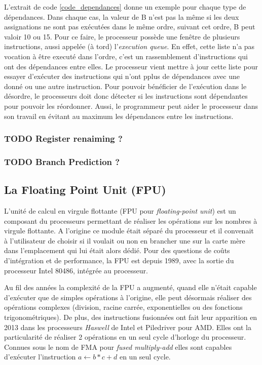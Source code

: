 L'extrait de code \ref{code_dependances} donne un exemple pour chaque type de dépendances. Dans chaque cas, la valeur de B n'est pas la même si les deux assignations ne sont pas exécutées dans le même ordre, suivant cet ordre, B peut valoir 10 ou 15. Pour ce faire, le processeur possède une fenêtre de plusieurs instructions, aussi appelée (à tord) l'\textit{execution queue}. En effet, cette liste n'a pas vocation à être executé dans l'ordre, c'est un rassemblement d'instructions qui ont des dépendances entre elles. Le processeur vient mettre à jour cette liste pour essayer d'exécuter des instructions qui n'ont pplus de dépendances avec une donné ou une autre instruction.
Pour pouvoir bénéficier de l'exécution dans le désordre, le processeurs doit donc détecter si les instructions sont dépendantes pour pouvoir les réordonner. Aussi, le programmeur peut aider le processeur dans son travail en évitant au maximum les dépendances entre les instructions.

\subsubsection{TODO Register renaiming ?}


\subsubsection{TODO Branch Prediction ?}



\subsection{La Floating Point Unit (FPU)}

L'unité de calcul en virgule flottante (FPU pour \textit{floating-point  unit}) est un composant du processeurs permettant de réaliser les opérations sur les nombres à virgule flottante. A l'origine ce module était séparé du processeur et il convenait à l'utilisateur de choisir si il voulait ou non en brancher une sur la carte mère dans l'emplacement qui lui était alors dédié. Pour des questions de coûts d'intégration et de performance, la FPU est depuis 1989, avec la sortie du processeur Intel 80486,  intégrée au processeur. 

Au fil des années la complexité de la FPU a augmenté, quand elle n'était capable d'exécuter que de simples opérations à l'origine, elle peut désormais réaliser des opérations complexes (division, racine carrée, exponentielles ou des fonctions trigonométriques).  De plus, des instructions fusionnées ont fait leur apparition en 2013 dans les processeurs \textit{Haswell} de Intel et Piledriver pour AMD. Elles ont la particularité de réaliser 2 opérations en un seul cycle d'horloge du processeur. Connues sous le nom de FMA pour \textit{fused multiply-add} elles sont capables d'exécuter l'instruction $a \leftarrow b * c + d$ en un seul cycle. 

